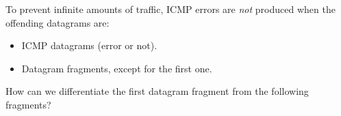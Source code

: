 To prevent infinite amounts of traffic, ICMP errors are \textit{not} produced
when the offending datagrams are:
\begin{itemize}
\item ICMP datagrams (error or not).
\item Datagram fragments, except for the first one.
\end{itemize}

\begin{exercise}
How can we differentiate the first datagram fragment from the following fragments?
\end{exercise}
